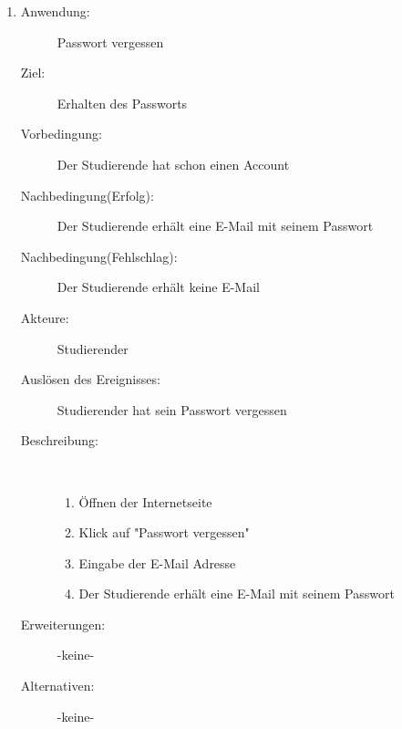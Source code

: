 \documentclass[parskip=full]{scrartcl}
\newcommand{\swtLabel}[1]{\textbf{/#1\arabic*0/}}
\begin{document}
\begin{enumerate}[label=\swtLabel{S}]
  
  \item
    \begin{description}
  	\item[Anwendung:] Passwort vergessen
  	\item[Ziel:] Erhalten des Passworts
  	\item[Vorbedingung:] Der Studierende hat schon einen Account
  	\item[Nachbedingung(Erfolg):] Der Studierende erhält eine E-Mail mit seinem
  	Passwort
  	\item[Nachbedingung(Fehlschlag):] Der Studierende erhält keine E-Mail
  	\item[Akteure:] Studierender
  	\item[Auslösen des Ereignisses:] Studierender hat sein Passwort vergessen
  	\item[Beschreibung:]~
  	\begin{enumerate}
  	  \item Öffnen der Internetseite
      \item Klick auf "Passwort vergessen"
      \item Eingabe der E-Mail Adresse
      \item Der Studierende erhält eine E-Mail mit seinem Passwort
  	\end{enumerate}
  	\item[Erweiterungen:] -keine-
  	\item[Alternativen:] -keine-
  \end{description}
   
\end{enumerate}
\end{document}
